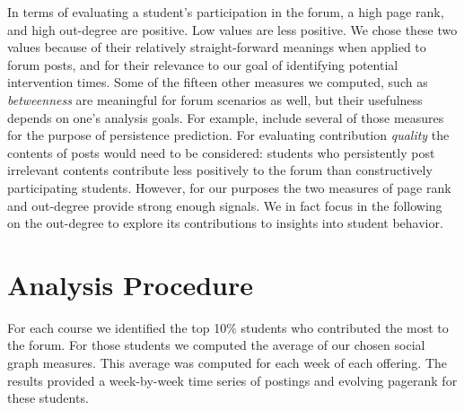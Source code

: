 In terms of evaluating a student's participation in the forum, a high
page rank, and high out-degree are positive. Low values are less
positive. We chose these two values because of their relatively
straight-forward meanings when applied to forum posts, and for their
relevance to our goal of identifying potential intervention times.
Some of the fifteen other measures we computed, such as {\em
  betweenness} are meaningful for forum scenarios as well, but their
usefulness depends on one's analysis goals. For example,
\cite{yang2013} include several of those measures for the purpose of
persistence prediction. For evaluating contribution {\em quality} the
contents of posts would need to be considered: students who
persistently post irrelevant contents contribute less positively to
the forum than constructively participating students. However, for our
purposes the two measures of page rank and out-degree provide strong
enough signals. We in fact focus in the following on the out-degree
to explore its contributions to insights into student behavior.

\section{Analysis Procedure}

For each course we identified the top 10\% students who contributed
the most to the forum. For those students we computed the average of
our chosen social graph measures. This average was computed for each
week of each offering. The results provided a week-by-week time series
of postings and evolving pagerank for these students.

